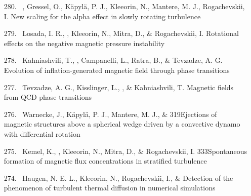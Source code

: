 \begin{itemize}
\item[{280.}~]
\Brandenburg, Gressel, O., K\"apyl\"a, P. J., Kleeorin, N., Mantere, M. J., Rogachevskii, I.
{New scaling for the alpha effect in slowly rotating turbulence}

\item[{279.}~]
Losada, I. R., \Brandenburg, Kleeorin, N., Mitra, D., \& Rogachevskii, I.
{Rotational effects on the negative magnetic pressure instability}

\item[{278.}~]
Kahniashvili, T., \Brandenburg, Campanelli, L., Ratra, B., \& Tevzadze, A. G.
{Evolution of inflation-generated magnetic field through phase transitions}

\item[{277.}~]
Tevzadze, A. G., Kisslinger, L., \Brandenburg, \& Kahniashvili, T.
{Magnetic fields from QCD phase transitions}

\item[{276.}~]
Warnecke, J., K\"apyl\"a, P. J., Mantere, M. J., \& \Brandenburg{}
{319}{Ejections of magnetic structures above a spherical wedge driven by a convective dynamo with differential rotation}

\item[{275.}~]
Kemel, K., \Brandenburg, Kleeorin, N., Mitra, D., \& Rogachevskii, I.
{333}{Spontaneous formation of magnetic flux concentrations in stratified turbulence}

\item[{274.}~]
Haugen, N. E. L., Kleeorin, N., Rogachevskii, I., \& \Brandenburg{}
{Detection of the phenomenon of turbulent thermal diffusion in numerical simulations}


\end{itemize}
